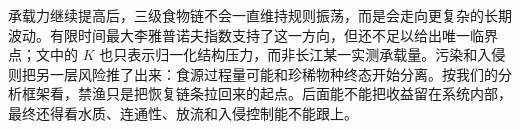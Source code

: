 承载力继续提高后，三级食物链不会一直维持规则振荡，而是会走向更复杂的长期波动。有限时间最大李雅普诺夫指数支持了这一方向，但还不足以给出唯一临界点；文中的 $K$ 也只表示归一化结构压力，而非长江某一实测承载量。污染和入侵则把另一层风险推了出来：食源过程量可能和珍稀物种终态开始分离。按我们的分析框架看，禁渔只是把恢复链条拉回来的起点。后面能不能把收益留在系统内部，最终还得看水质、连通性、放流和入侵控制能不能跟上。
